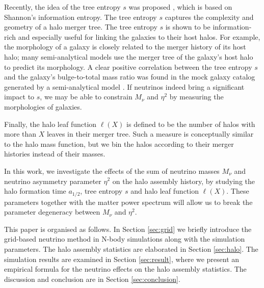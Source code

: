 Recently, the idea of the tree entropy $s$ was proposed \cite{tree entropy}, which is based on Shannon's information entropy. The tree entropy $s$ captures the complexity and geometry of a halo merger tree. The tree entropy $s$ is shown to be information-rich and especially useful for linking the galaxies to their host halos. For example, the morphology of a galaxy is closely related to the merger history of its host halo; many semi-analytical models use the merger tree of the galaxy's host halo to predict its morphology. 
A clear positive correlation between the tree entropy $s$ and the galaxy's bulge-to-total mass ratio was found in the mock galaxy catalog generated by a semi-analytical model \cite{tree entropy}. If neutrinos indeed bring a significant impact to $s$, we may be able to constrain $M_\nu$ and $\eta^2$ by measuring the morphologies of galaxies.

Finally, the halo leaf function $\ell(X)$ is defined to be the number of halos with more than $X$ leaves in their merger tree. Such a measure is conceptually similar to the halo mass function, but we bin the halos according to their merger histories instead of their masses. 

In this work, we investigate the effects of the sum of neutrino masses $M_\nu$ and neutrino asymmetry parameter $\eta^2$ on the halo assembly history, by studying the halo formation time $a_{1/2}$, tree entropy $s$ and halo leaf function $\ell(X)$. These parameters together with the matter power spectrum will allow us to break the parameter degeneracy between $M_\nu$ and $\eta^2$.

This paper is organised as follows. In Section \ref{sec:grid} we briefly introduce the grid-based neutrino method in N-body simulations along with the simulation parameters. The halo assembly statistics are elaborated in Section \ref{sec:halo}. The simulation results are examined in Section \ref{sec:result}, where we present an empirical formula for the neutrino effects on the halo assembly statistics. The discussion and conclusion are in Section \ref{sec:conclusion}. 

